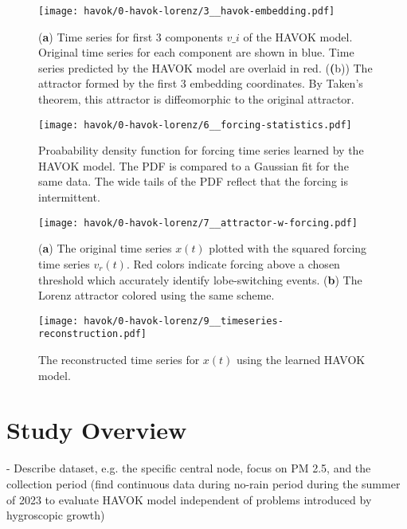 \begin{figure}[h]
  \centering
  \texttt{[image: havok/0-havok-lorenz/3\_\_havok-embedding.pdf]}
  \caption{(\textbf{a}) Time series for first 3 components $v\_i$ of the HAVOK
    model. Original time series for each component are shown in blue. Time
    series predicted by the HAVOK model are overlaid in red. (\textbf(b)) The
    attractor formed by the first 3 embedding coordinates. By Taken's theorem,
    this attractor is diffeomorphic to the original attractor.}
  \label{fig:lorenz-havok-embedding}
\end{figure}



\begin{figure}[h]
  \centering
  \texttt{[image: havok/0-havok-lorenz/6\_\_forcing-statistics.pdf]}
  \caption{Proabability density function for forcing time series learned by the
    HAVOK model. The PDF is compared to a Gaussian fit for the same data. The
    wide tails of the PDF reflect that the forcing is intermittent.}
  \label{fig:lorenz-forcing-stats}
\end{figure}


\begin{figure}[h]
  \centering
  \texttt{[image: havok/0-havok-lorenz/7\_\_attractor-w-forcing.pdf]}
  \caption{(\textbf{a}) The original time series $x(t)$ plotted with the squared
  forcing time series $v_r(t)$. Red colors indicate forcing above a chosen
  threshold which accurately identify lobe-switching events. (\textbf{b}) The
  Lorenz attractor colored using the same scheme.}
  \label{fig:lorenz-attractor-forcing}
\end{figure}



\begin{figure}[h]
  \centering
  \texttt{[image: havok/0-havok-lorenz/9\_\_timeseries-reconstruction.pdf]}
  \caption{The reconstructed time series for $x(t)$ using the learned HAVOK model.}
  \label{fig:lorenz-reconstruction}
\end{figure}




\section{Study Overview}

- Describe dataset, e.g. the specific central node, focus on PM 2.5, and the
collection period (find continuous data during no-rain period during the summer
of 2023 to evaluate HAVOK model independent of problems introduced by
hygroscopic growth)


